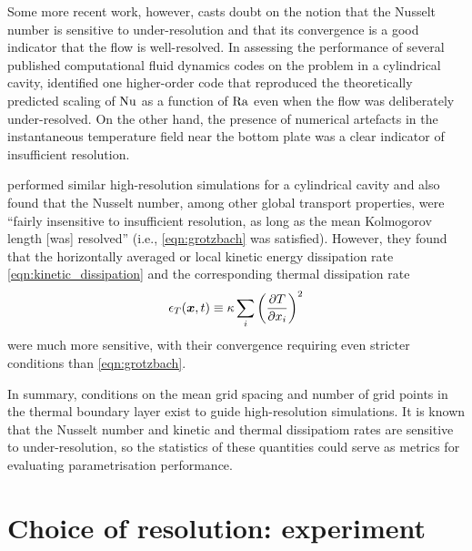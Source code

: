 \documentclass[../main.tex]{subfiles}
\begin{document}
Some more recent work, however, casts doubt on the notion that the Nusselt
number is sensitive to under-resolution and that its convergence is a good
indicator that the flow is well-resolved. In assessing the performance of
several published computational fluid dynamics codes on the \rb{} problem in a
cylindrical cavity, \textcite{kooij2018} identified one higher-order code that
reproduced the theoretically predicted scaling of $\mathrm{Nu}$ as a function of
$\mathrm{Ra}$ even when the flow was deliberately under-resolved. On the other
hand, the presence of numerical artefacts in the instantaneous temperature
field near the bottom plate was a clear indicator of insufficient resolution.

\textcite{scheel2013} performed similar high-resolution simulations for a
cylindrical cavity and also found that the Nusselt number, among other global
transport properties, were ``fairly insensitive to insufficient resolution, as
long as the mean Kolmogorov length [was] resolved'' (i.e., \cref{eqn:grotzbach}
was satisfied). However, they found that the horizontally averaged or local
kinetic energy dissipation rate \cref{eqn:kinetic_dissipation} and the
corresponding thermal dissipation rate
\begin{equation}
    \label{eqn:thermal_dissipation}
    \epsilon_T(\bm{x}, t) \equiv \kappa \sum_i \left(\frac{\partial T}{\partial x_i}\right)^2
\end{equation}
were much more sensitive, with their convergence requiring even stricter
conditions than \cref{eqn:grotzbach}.

In summary, conditions on the mean grid spacing and number of grid points in
the thermal boundary layer exist to guide high-resolution simulations. It is
known that the Nusselt number and kinetic and thermal dissipatiom rates are
sensitive to under-resolution, so the statistics of these quantities could
serve as metrics for evaluating parametrisation performance.


\section{Choice of resolution: experiment}


\ifSubfilesClassLoaded{%
    \emergencystretch=5em
    \printbibliography{}
}{}
\end{document}
